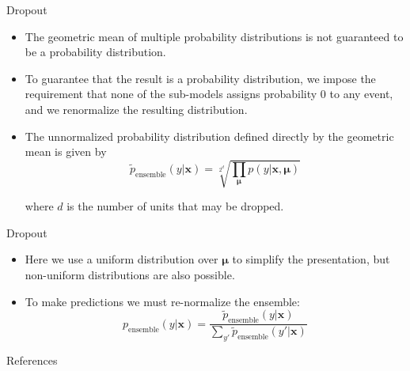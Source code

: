 \documentclass[10pt]{beamer}
\begin{document}
	\begin{frame}{Dropout}
		\begin{itemize}
			\item The geometric mean of multiple probability distributions is not guaranteed to be a probability distribution.
			\pause
			\item To guarantee that the result is a probability distribution, we impose the requirement that none of the sub-models assigns probability 0 to any event, and we renormalize the resulting distribution.
			\pause
			\item The unnormalized probability distribution defined directly by the geometric mean is given by
			$$\tilde{p}_{\text{ensemble}}(y|\bm{x})=\sqrt[2^d]{\prod_{\bm{\mu}}p(y|\bm{x},\bm{\mu})}$$
			
			where $d$ is the number of units that may be dropped.
		\end{itemize}
	\end{frame}
	
	\begin{frame}{Dropout}
		\begin{itemize}
			\item Here we use a uniform distribution over $\bm{\mu}$ to simplify the presentation, but non-uniform distributions are also possible.
			\pause
			\item To make predictions we must re-normalize the ensemble:
			$$p_{\text{ensemble}}(y|\bm{x})=\frac{\tilde{p}_{\text{ensemble}}(y|\bm{x})}{\sum_{y'}\tilde{p}_{\text{ensemble}}(y'|\bm{x})}$$
		\end{itemize}
	\end{frame}
	
	\begin{frame}[allowframebreaks]{References}
		
		
	\end{frame}
\end{document}
